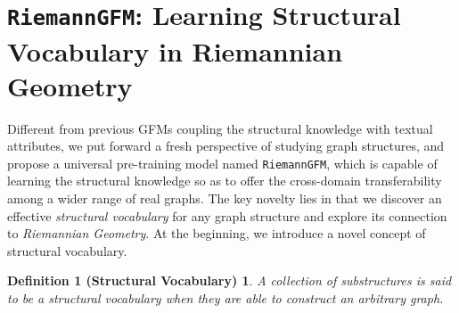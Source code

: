 \section{\textbf{\texttt{RiemannGFM}}: Learning Structural Vocabulary in Riemannian Geometry}


\vspace{-0.02in}
Different from previous GFMs coupling the structural knowledge with textual attributes,
we put forward a fresh perspective of studying graph structures, and propose a universal pre-training model named \texttt{RiemannGFM},
which is capable of learning the structural knowledge so as to offer the cross-domain transferability among a wider range of real graphs.
The key novelty lies in that we discover an effective \emph{structural vocabulary} for any graph structure and explore its connection to \emph{Riemannian Geometry}.
At the beginning, we introduce a novel concept of  structural vocabulary.
 \begin{mymath}
\newtheorem*{def1}{Definition 1 (Structural Vocabulary)} 
\begin{def1}
A collection of substructures is said to be a structural vocabulary when they are able to construct an arbitrary graph.
\end{def1}
\end{mymath}
\vspace{-0.1in}
